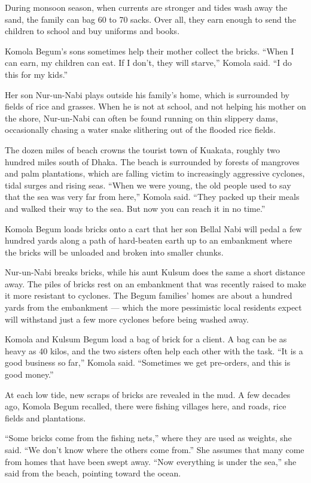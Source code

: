 During monsoon season, when currents are stronger and tides wash away
the sand, the family can bag 60 to 70 sacks. Over all, they earn enough
to send the children to school and buy uniforms and books.

Komola Begum's sons sometimes help their mother collect the bricks.
``When I can earn, my children can eat. If I don't, they will starve,''
Komola said. ``I do this for my kids.''

Her son Nur-un-Nabi plays outside his family's home, which is surrounded
by fields of rice and grasses. When he is not at school, and not helping
his mother on the shore, Nur-un-Nabi can often be found running on thin
slippery dams, occasionally chasing a water snake slithering out of the
flooded rice fields.

The dozen miles of beach crowns the tourist town of Kuakata, roughly two
hundred miles south of Dhaka. The beach is surrounded by forests of
mangroves and palm plantations, which are falling victim to increasingly
aggressive cyclones, tidal surges and rising seas. ``When we were young,
the old people used to say that the sea was very far from here,'' Komola
said. ``They packed up their meals and walked their way to the sea. But
now you can reach it in no time.''

Komola Begum loads bricks onto a cart that her son Bellal Nabi will
pedal a few hundred yards along a path of hard-beaten earth up to an
embankment where the bricks will be unloaded and broken into smaller
chunks.

Nur-un-Nabi breaks bricks, while his aunt Kulsum does the same a short
distance away. The piles of bricks rest on an embankment that was
recently raised to make it more resistant to cyclones. The Begum
families' homes are about a hundred yards from the embankment --- which
the more pessimistic local residents expect will withstand just a few
more cyclones before being washed away.

Komola and Kulsum Begum load a bag of brick for a client. A bag can be
as heavy as 40 kilos, and the two sisters often help each other with the
task. ``It is a good business so far,'' Komola said. ``Sometimes we get
pre-orders, and this is good money.''

At each low tide, new scraps of bricks are revealed in the mud. A few
decades ago, Komola Begum recalled, there were fishing villages here,
and roads, rice fields and plantations.

``Some bricks come from the fishing nets,'' where they are used as
weights, she said. ``We don't know where the others come from.'' She
assumes that many come from homes that have been swept away. ``Now
everything is under the sea,'' she said from the beach, pointing toward
the ocean.

